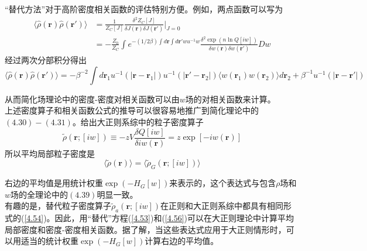 “替代方法”对于高阶密度相关函数的评估特别方便。例如，两点函数可以写为\\
\begin{equation}
\begin{aligned}
\langle  \hat{ \rho } (\mathbf{r}) \hat{ \rho } (\mathbf{r'}) \rangle &= \frac{1}{Z_{C}[J]} \frac{\delta ^{2}Z_{C}[J]}{\delta J(\mathbf{r}) \delta J(\mathbf{r'})} \bigg|_{J=0} \\&= -\frac{Z_0}{Z_{C}} \int  e^{-(1/2 \beta ) \int d\mathbf{r} \int d\mathbf{r'} w u^{-1} w } \frac{ \delta ^{2} \exp (n \ln Q[i w ])}{\delta w (\mathbf{r}) \delta w (\mathbf{r'})}D w
\end{aligned}
\label{4.55}
\end{equation}
经过两次分部积分得出\\
\begin{equation}
\langle  \hat{ \rho } (\mathbf{r}) \hat{ \rho } (\mathbf{r'}) \rangle = - \beta ^{-2} \int d\mathbf{r}_{1}  u^{-1}(|\mathbf{r}-\mathbf{r}_{1}|) u^{-1}(|\mathbf{r'}-\mathbf{r}_{2}|) \langle w(\mathbf{r}_1) w(\mathbf{r}_2)\rangle d\mathbf{r}_{2} + \beta ^{-1} u^{-1} (|\mathbf{r-r'}|)
\label{4.56}
\end{equation}

从而简化场理论中的密度-密度对相关函数可以由$w$场的对相关函数来计算。\\

上述密度算子和相关函数公式的推导可以很容易地推广到简化理论中的$(4.30)-(4.31)$。给出大正则系综中的粒子密度算子\\
\begin{equation}
\tilde{ \rho }(\mathbf{r};[i w ]) \equiv -z V \frac{ \delta Q[i w]}{\delta i w (\mathbf{r})} = z \exp [-i w (\mathbf{r})]
\end{equation}
所以平均局部粒子密度是\\
\begin{equation}
\langle \tilde{ \rho } (\mathbf{r}) \rangle = \langle \tilde{ \rho }_{G}(\mathbf{r};[i w ]) \rangle
\end{equation}

右边的平均值是用统计权重$\exp ( -H_{G}[ w])$来表示的，这个表达式与包含$ \rho $场和$ w $场的全理论中的$(4.39)$明显一致。\\

有趣的是，替代粒子密度算子$ \tilde{ \rho }_{a}(\mathbf{r};[i w])$在正则和大正则系综中都具有相同形式的(\ref{4.54})。因此，用“替代”方程(\ref{4.53})和(\ref{4.56})可以在大正则理论中计算平均局部密度和密度-密度相关函数。据了解，当这些表达式应用于大正则情形时，可以用适当的统计权重$\exp (-H_{G}[ w ])$计算右边的平均值。\\

